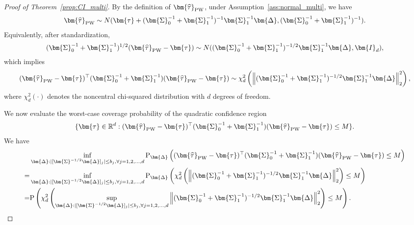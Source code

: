\documentclass[11pt]{article}
\def\P{{\mathrm P}}
\newcommand{\htau}{\widehat\tau}
\numberwithin{equation}{section}
\theoremstyle{definition}
\begin{document}
\begin{proof}[Proof of Theorem~\ref{prop:CI_multi}]
By the definition of $\bm{\htau}_{\rm PW}$, under Assumption~\ref{ass:normal_multi}, we have 
\[
  \bm{\htau}_{\rm PW} \sim N(\bm{\tau} + (\bm{\Sigma}_0^{-1} + \bm{\Sigma}_1^{-1})^{-1} \bm{\Sigma}_1^{-1} \bm{\Delta}, (\bm{\Sigma}_0^{-1} + \bm{\Sigma}_1^{-1})^{-1} ).
\]
Equivalently, after standardization,
\begin{align*}
  (\bm{\Sigma}_0^{-1} + \bm{\Sigma}_1^{-1})^{1/2} (\bm{\htau}_{\rm PW} - \bm{\tau}) \sim N((\bm{\Sigma}_0^{-1} + \bm{\Sigma}_1^{-1})^{-1/2} \bm{\Sigma}_1^{-1} \bm{\Delta}, \bm{I}_d),
\end{align*}
which implies
\begin{align*}
  (\bm{\htau}_{\rm PW} - \bm{\tau})^\top (\bm{\Sigma}_0^{-1} + \bm{\Sigma}_1^{-1}) (\bm{\htau}_{\rm PW} - \bm{\tau}) \sim \chi^2_d\left(\left\lVert (\bm{\Sigma}_0^{-1} + \bm{\Sigma}_1^{-1})^{-1/2} \bm{\Sigma}_1^{-1} \bm{\Delta}\right\rVert_2^2\right),
\end{align*}
where $\chi^2_d(\cdot)$ denotes the noncentral chi-squared distribution with
$d$ degrees of freedom.

We now evaluate the worst-case coverage probability of the quadratic confidence region
\[
  \{\bm{\tau}\in\mathbb{R}^d:(\bm{\htau}_{\rm PW}-\bm{\tau})^\top (\bm{\Sigma}_0^{-1} + \bm{\Sigma}_1^{-1})(\bm{\htau}_{\rm PW}-\bm{\tau})\le M\}.
\]
We have
\begin{align*}
  &\inf_{\bm{\Delta}: \lvert [\bm{\Sigma}^{-1/2} \bm{\Delta}]_j \rvert \le b_j,\forall j=1,2,\ldots,d} \P_{\bm{\Delta}}\left((\bm{\htau}_{\rm PW}-\bm{\tau})^\top (\bm{\Sigma}_0^{-1} + \bm{\Sigma}_1^{-1})(\bm{\htau}_{\rm PW}-\bm{\tau})\le M\right)\\
  =& \inf_{\bm{\Delta}: \lvert [\bm{\Sigma}^{-1/2} \bm{\Delta}]_j \rvert \le b_j,\forall j=1,2,\ldots,d} \P_{\bm{\Delta}}\left(\chi^2_d\left(\left\lVert (\bm{\Sigma}_0^{-1} + \bm{\Sigma}_1^{-1})^{-1/2} \bm{\Sigma}_1^{-1} \bm{\Delta}\right\rVert_2^2\right) \le M\right)\\
  =& \P\left(\chi^2_d\left(\sup_{\bm{\Delta}: \lvert [\bm{\Sigma}^{-1/2} \bm{\Delta}]_j \rvert \le b_j,\forall j=1,2,\ldots,d}\left\lVert (\bm{\Sigma}_0^{-1} + \bm{\Sigma}_1^{-1})^{-1/2} \bm{\Sigma}_1^{-1} \bm{\Delta}\right\rVert_2^2\right) \le M\right).
\end{align*}


\end{proof}
\end{document}
